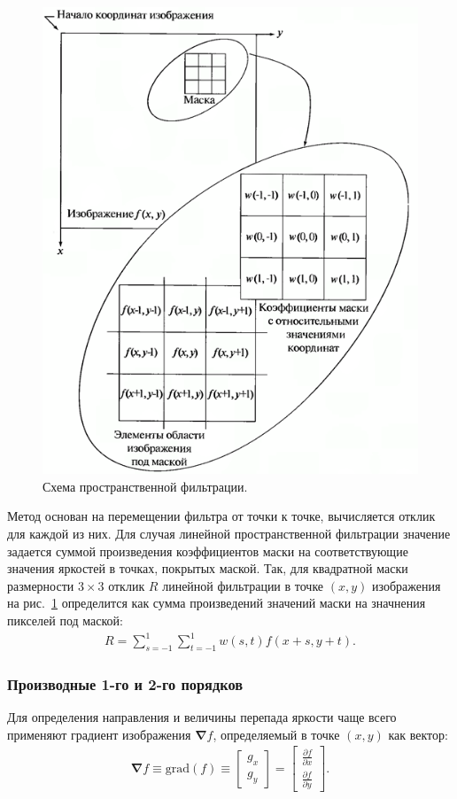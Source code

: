 \documentclass[12pt,a4paper]{article} %
\begin{document}
\begin{figure}[h]
	
	\centering
	
	\includegraphics[width=0.5\linewidth]{prost_filt.jpg}
	
	\caption{Схема пространственной фильтрации.}
	
	\label{fig:prost_filt}
	
\end{figure}

\newpage

 Метод основан на перемещении фильтра от точки к точке, вычисляется отклик для каждой из них. Для случая линейной пространственной фильтрации значение задается суммой произведения коэффициентов маски на соответствующие значения яркостей в точках, покрытых маской. Так, для квадратной маски размерности $3\times3$ отклик $R$ линейной фильтрации в точке $(x, y)$ изображения на рис.~\ref{fig:prost_filt} определится как сумма произведений значений маски на значнения пикселей под маской:
\begin{gather}\label{3.1}
R = \sum\limits_{s=-1}^{1}
{\sum\limits_{t=-1}^{1}{w(s,t)f(x+s, y+t)}}.
\end{gather}

\subsubsection{Производные 1-го и 2-го порядков}

Для определения направления и величины перепада яркости чаще всего применяют градиент изображения $\boldsymbol{\nabla}f$, определяемый в точке $(x,y)$ как вектор:
\begin{gather}\label{grad}
	\boldsymbol{\nabla}{f} \equiv \text{grad}(f)\equiv
	\begin{bmatrix} g_x \\ g_y \end{bmatrix}=
	\begin{bmatrix} \frac{\partial f}{\partial x} \\ \frac{\partial f}{\partial y}
	\end{bmatrix}.
\end{gather}
\end{document}

